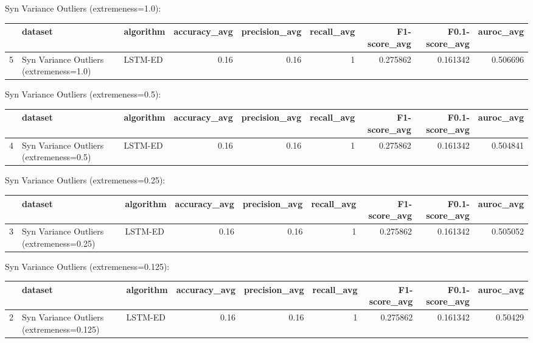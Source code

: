 Syn Variance Outliers (extremeness=1.0):

\begin{tabular}{rllrrrrrr}
\hline
    & dataset                                 & algorithm   &   accuracy\_avg &   precision\_avg &   recall\_avg &   F1-score\_avg &   F0.1-score\_avg &   auroc\_avg \\
\hline
  5 & Syn Variance Outliers (extremeness=1.0) & LSTM-ED     &           0.16 &            0.16 &            1 &       0.275862 &         0.161342 &    0.506696 \\
\hline
\end{tabular}

Syn Variance Outliers (extremeness=0.5):

\begin{tabular}{rllrrrrrr}
\hline
    & dataset                                 & algorithm   &   accuracy\_avg &   precision\_avg &   recall\_avg &   F1-score\_avg &   F0.1-score\_avg &   auroc\_avg \\
\hline
  4 & Syn Variance Outliers (extremeness=0.5) & LSTM-ED     &           0.16 &            0.16 &            1 &       0.275862 &         0.161342 &    0.504841 \\
\hline
\end{tabular}

Syn Variance Outliers (extremeness=0.25):

\begin{tabular}{rllrrrrrr}
\hline
    & dataset                                  & algorithm   &   accuracy\_avg &   precision\_avg &   recall\_avg &   F1-score\_avg &   F0.1-score\_avg &   auroc\_avg \\
\hline
  3 & Syn Variance Outliers (extremeness=0.25) & LSTM-ED     &           0.16 &            0.16 &            1 &       0.275862 &         0.161342 &    0.505052 \\
\hline
\end{tabular}

Syn Variance Outliers (extremeness=0.125):

\begin{tabular}{rllrrrrrr}
\hline
    & dataset                                   & algorithm   &   accuracy\_avg &   precision\_avg &   recall\_avg &   F1-score\_avg &   F0.1-score\_avg &   auroc\_avg \\
\hline
  2 & Syn Variance Outliers (extremeness=0.125) & LSTM-ED     &           0.16 &            0.16 &            1 &       0.275862 &         0.161342 &     0.50429 \\
\hline
\end{tabular}

